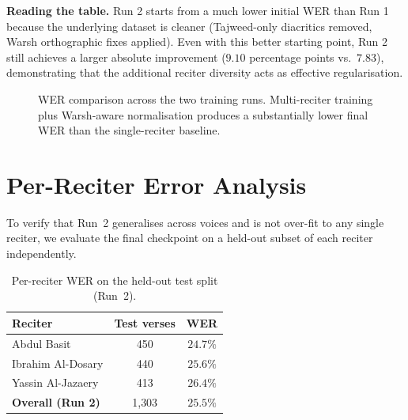 \textbf{Reading the table.} Run 2 starts from a much lower initial WER
than Run 1 because the underlying dataset is cleaner (Tajweed-only
diacritics removed, Warsh orthographic fixes applied). Even with this
better starting point, Run 2 still achieves a larger absolute
improvement ($9.10$ percentage points vs.\ $7.83$), demonstrating that
the additional reciter diversity acts as effective regularisation.

\begin{figure}[H]
  \centering
  \caption{WER comparison across the two training runs. Multi-reciter
  training plus Warsh-aware normalisation produces a substantially lower
  final WER than the single-reciter baseline.}
  \label{fig:mt_wer_compare}
\end{figure}

\section{Per-Reciter Error Analysis}

To verify that Run~2 generalises across voices and is not over-fit to
any single reciter, we evaluate the final checkpoint on a held-out
subset of each reciter independently.

\begin{table}[H]
  \centering
  \caption{Per-reciter WER on the held-out test split (Run~2).}
  \label{tab:mt_per_reciter}
  \renewcommand{\arraystretch}{1.3}
  \begin{tabular}{lcc}
    \toprule
    \textbf{Reciter} & \textbf{Test verses} & \textbf{WER} \\
    \midrule
    Abdul Basit                & 450 & $24.7\%$ \\
    Ibrahim Al-Dosary          & 440 & $25.6\%$ \\
    Yassin Al-Jazaery          & 413 & $26.4\%$ \\
    \midrule
    \textbf{Overall (Run 2)}   & 1{,}303 & $\mathbf{25.5\%}$ \\
    \bottomrule
  \end{tabular}
\end{table}

